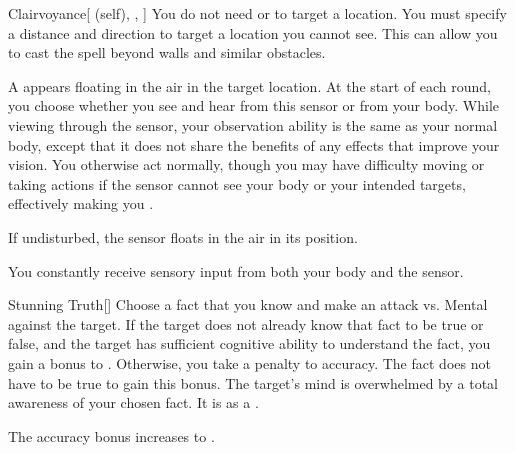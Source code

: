 \lowercase{\hypertarget{spell:Clairvoyance}{}}\label{spell:Clairvoyance}
\begin{attuneability}[Rank 5]{\hypertarget{spell:Clairvoyance}{Clairvoyance}}[ (self), , ]
You do not need  or  to target a location.
You must specify a distance and direction to target a location you cannot see.
This can allow you to cast the spell beyond walls and similar obstacles.

A  appears floating in the air in the target location.
At the start of each round, you choose whether you see and hear from this sensor or from your body.
While viewing through the sensor, your observation ability is the same as your normal body, except that it does not share the benefits of any  effects that improve your vision.
You otherwise act normally, though you may have difficulty moving or taking actions if the sensor cannot see your body or your intended targets, effectively making you \blinded.

If undisturbed, the sensor floats in the air in its position.

\rankline
{} You constantly receive sensory input from both your body and the sensor.

\end{attuneability}
\vspace{0.25em}



\lowercase{\hypertarget{spell:Stunning Truth}{}}\label{spell:Stunning Truth}
\begin{freeability}[Rank 5]{\hypertarget{spell:Stunning Truth}{Stunning Truth}}[]
Choose a fact that you know and make an attack vs. Mental against the target.
If the target does not already know that fact to be true or false,
and the target has sufficient cognitive ability to understand the fact,
you gain a  bonus to .
Otherwise, you take a  penalty to accuracy.
The fact does not have to be true to gain this bonus.
\hit The target's mind is overwhelmed by a total awareness of your chosen fact.
It is  as a .

\rankline
{} The accuracy bonus increases to .
\end{freeability}
\vspace{0.25em}



